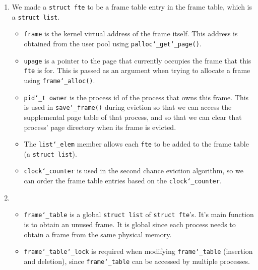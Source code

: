 \documentclass{article}
\renewcommand{\_}{\char`_}
\begin{document}
\begin{enumerate}

\item

We made a \texttt{struct fte} to be a frame table entry in the frame table, which is a \texttt{struct list}.

\begin{itemize}
\item

\texttt{frame} is the kernel virtual address of the frame itself. This address is obtained from the user pool using \texttt{palloc\_get\_page()}.

\item

\texttt{upage} is a pointer to the page that currently occupies the frame that this \texttt{fte} is for. This is passed as an argument when trying to allocate a frame using \texttt{frame\_alloc()}.

\item

\texttt{pid\_t owner} is the process id of the process that owns this frame. This is used in \texttt{save\_frame()} during eviction so that we can access the supplemental page table of that process, and so that we can clear that process' page directory when its frame is evicted.

\item

The \texttt{list\_elem} member allows each \texttt{fte} to be added to the frame table (a \texttt{struct list}). 

\item

\texttt{clock\_counter} is used in the second chance eviction algorithm, so we can order the frame table entries based on the \texttt{clock\_counter}.

\end{itemize}

\item

\begin{itemize}
\item

\texttt{frame\_table} is a global \texttt{struct list} of \texttt{struct fte}'s. It's main function is to obtain an unused frame. It is global since each process needs to obtain a frame from the same physical memory.

\item

\texttt{frame\_table\_lock} is required when modifying \texttt{frame\_table} (insertion and deletion), since \texttt{frame\_table} can be accessed by multiple processes.

\end{itemize}

\end{enumerate}
\end{document}

